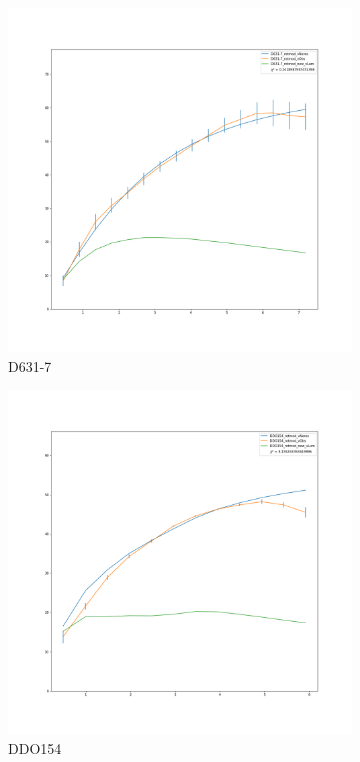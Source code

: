 \documentclass[reprint,%
 amsmath,amssymb,
 aps,
]{revtex4-1}
\begin{document}
\begin{figure}[h]
\begin{subfigure}{.5\textwidth}
  \centering
  \includegraphics[width=.8\linewidth]{figures/D631-7_rotmod_XueSofue.png}
  \caption{D631-7}
  \label{fig:sfig3}
\end{subfigure}
\begin{subfigure}{.5\textwidth}
  \centering
  \includegraphics[width=.8\linewidth]{figures/DDO154_rotmod_XueSofue.png}
  \caption{DDO154}
  \label{fig:sfig4}
\end{subfigure}%
\begin{subfigure}{.5\textwidth}
  \centering

\end{subfigure}
\end{figure}
\end{document}
